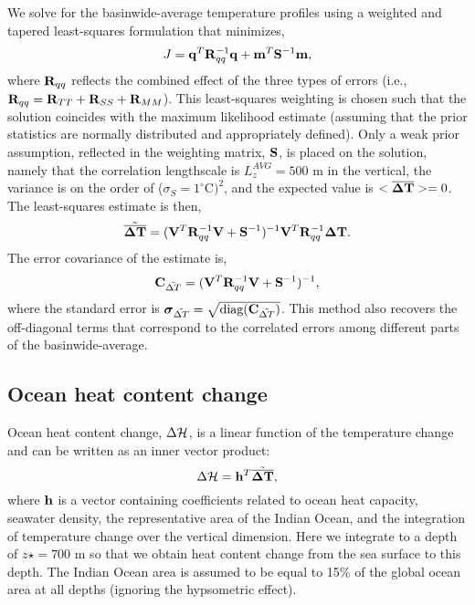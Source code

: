 \documentclass[12pt]{article}
\begin{document}
We solve for the basinwide-average temperature profiles using a
weighted and tapered least-squares formulation that minimizes, 
\begin{equation}
\label{eq:qWq}
J = {\bf q}^T {\bf R}_{qq}^{-1} {\bf q} + {\bf m}^T {\bf S}^{-1} {\bf m},
\end{equation}  
where ${\bf R}_{qq}$ reflects the combined effect of the three types of errors (i.e., ${\bf R}_{qq} = {\bf R}_{TT} + {\bf R}_{SS} + {\bf R}_{MM}$). This least-squares weighting %
is chosen such that the solution coincides with the maximum likelihood estimate (assuming that the prior statistics are normally distributed and appropriately defined).
Only a weak prior assumption, reflected in the weighting matrix, ${\bf
  S}$, is placed on the solution, namely that the correlation
lengthscale is $L_z^{AVG} = 500$ m in the vertical, the variance is on the order of
($\sigma_S = 1^\circ$C$)^2$, and the expected value is $<\overline{{\boldsymbol \Delta}{\bf T}}>=0$.
The least-squares estimate is then,
\begin{equation}
\tilde{\overline{{\boldsymbol \Delta}{\bf T}}} = ({\bf V}^T {\bf R}_{qq}^{-1} {\bf V} + {\bf S}^{-1} )^{-1} {\bf V}^T {\bf R}_{qq}^{-1} {\boldsymbol \Delta}{\bf T}.
\end{equation}
 The error covariance of the estimate is,
\begin{equation}
  \label{eq:covariance17}
  \mbox{{\bf C}}_{{\tilde{\Delta T}}} = ({\bf V}^T {\bf R}_{qq}^{-1} {\bf V} + {\bf S}^{-1} )^{-1},
\end{equation}
where the standard error is
${\boldsymbol \sigma}_{\tilde{\Delta T}} =
\sqrt{\mbox{diag}(\mbox{{\bf C}}_{{\tilde{\Delta T}}})}$.  This method
also recovers the off-diagonal terms that correspond to the correlated
errors among different parts of the basinwide-average.

\subsection{Ocean heat content change}

Ocean heat content change, $\Delta {\cal H}$, is a linear function of
the temperature change and can be written as an inner vector product:
\begin{equation}
\Delta {\cal H} = {\bf h}^T \tilde{\overline{{\boldsymbol \Delta}{\bf T}}},
\end{equation}
where ${\bf h}$ is a vector containing coefficients related to ocean
heat capacity, seawater density, the representative area of the Indian
Ocean, and the integration of temperature change over the vertical
dimension. Here we integrate to a depth of $z\star = 700$ m so that we
obtain heat content change from the sea surface to this depth. The
Indian Ocean area is assumed to be equal to 15\% of the global ocean
area at all depths (ignoring the hypsometric effect).
  
\end{document}
